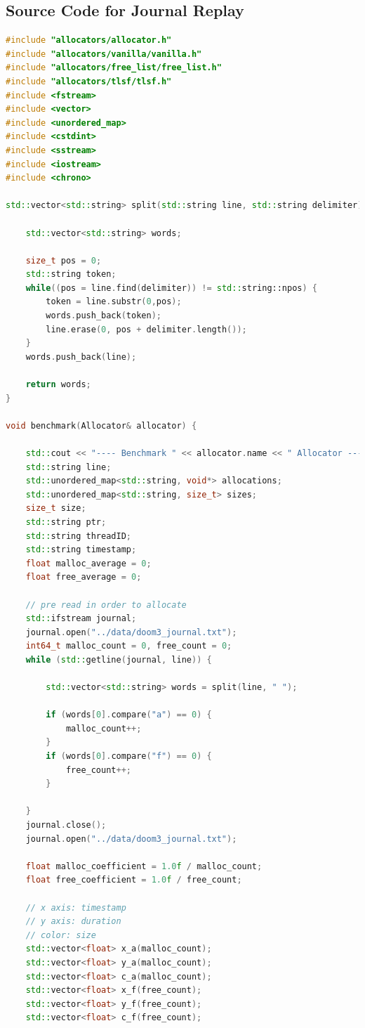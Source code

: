 \documentclass{article}
\begin{document}
{}

\pagebreak
\begin{appendices}
	\section[A]{Source Code for Journal Replay}
	\begin{lstlisting}[language=C++]
#include "allocators/allocator.h"
#include "allocators/vanilla/vanilla.h"
#include "allocators/free_list/free_list.h"
#include "allocators/tlsf/tlsf.h"
#include <fstream>
#include <vector>
#include <unordered_map>
#include <cstdint>
#include <sstream>
#include <iostream>
#include <chrono>
	
std::vector<std::string> split(std::string line, std::string delimiter) {
	
	std::vector<std::string> words;
		
	size_t pos = 0;
	std::string token;
	while((pos = line.find(delimiter)) != std::string::npos) {
		token = line.substr(0,pos);
		words.push_back(token);
		line.erase(0, pos + delimiter.length());
	}
	words.push_back(line);
		
	return words;
}
	
void benchmark(Allocator& allocator) {
		
	std::cout << "---- Benchmark " << allocator.name << " Allocator ----" << std::endl;
	std::string line;
	std::unordered_map<std::string, void*> allocations;
	std::unordered_map<std::string, size_t> sizes;
	size_t size;
	std::string ptr;
	std::string threadID;
	std::string timestamp;
	float malloc_average = 0;
	float free_average = 0;
		
	// pre read in order to allocate
	std::ifstream journal;
	journal.open("../data/doom3_journal.txt");
	int64_t malloc_count = 0, free_count = 0;
	while (std::getline(journal, line)) {
			
		std::vector<std::string> words = split(line, " ");
			
		if (words[0].compare("a") == 0) {
			malloc_count++;
		}
		if (words[0].compare("f") == 0) {
			free_count++;
		}
			
	}
	journal.close();
	journal.open("../data/doom3_journal.txt");
		
	float malloc_coefficient = 1.0f / malloc_count;
	float free_coefficient = 1.0f / free_count;
		
	// x axis: timestamp
	// y axis: duration
	// color: size
	std::vector<float> x_a(malloc_count);
	std::vector<float> y_a(malloc_count);
	std::vector<float> c_a(malloc_count);
	std::vector<float> x_f(free_count);
	std::vector<float> y_f(free_count);
	std::vector<float> c_f(free_count);
		

\end{lstlisting}
\end{appendices}
\end{document}
